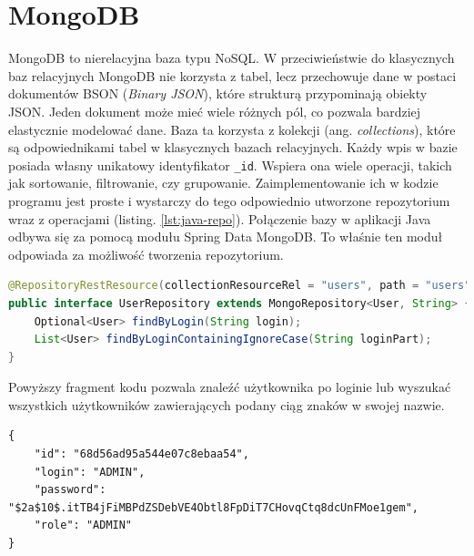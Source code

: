 \section{MongoDB}
MongoDB to nierelacyjna baza typu NoSQL. W przeciwieństwie do klasycznych baz relacyjnych MongoDB nie korzysta z tabel, lecz przechowuje dane w postaci dokumentów BSON (\textit{Binary JSON}), które strukturą przypominają obiekty JSON.
Jeden dokument może mieć wiele różnych pól, co pozwala bardziej elastycznie modelować dane. Baza ta korzysta z kolekcji (ang. \textit{collections}), które są odpowiednikami tabel w klasycznych bazach relacyjnych. Każdy wpis w bazie posiada własny unikatowy identyfikator \texttt{\_id}. Wspiera ona wiele operacji, takich jak sortowanie, filtrowanie, czy grupowanie. Zaimplementowanie ich w kodzie programu jest proste i wystarczy do tego odpowiednio utworzone repozytorium wraz z operacjami (listing. \ref{lst:java-repo}). Połączenie bazy w aplikacji Java odbywa się za pomocą modułu Spring Data MongoDB. To właśnie ten moduł odpowiada za możliwość tworzenia repozytorium.
\begin{lstlisting}[language={Java}, caption={Przykładowe repozytorium w Javie}, label={lst:java-repo}]
@RepositoryRestResource(collectionResourceRel = "users", path = "users")
public interface UserRepository extends MongoRepository<User, String> {
	Optional<User> findByLogin(String login);
	List<User> findByLoginContainingIgnoreCase(String loginPart);	
}	
\end{lstlisting}
Powyższy fragment kodu pozwala znaleźć użytkownika po loginie lub wyszukać wszystkich użytkowników zawierających podany ciąg znaków w swojej nazwie.
\begin{lstlisting}[caption={Przykladowy dokument z kolekcji}, label={lst:MongoDB-doc}]
{
	"id": "68d56ad95a544e07c8ebaa54",
	"login": "ADMIN",
	"password": "$2a$10$.itTB4jFiMBPdZSDebVE4Obtl8FpDiT7CHovqCtq8dcUnFMoe1gem",
	"role": "ADMIN"
}
\end{lstlisting}
